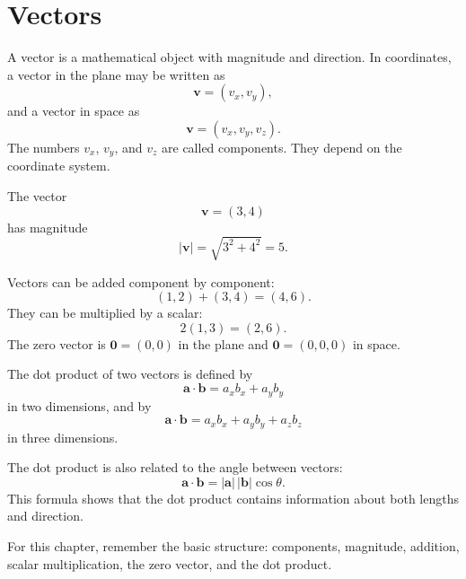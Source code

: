 \section{Vectors}

A vector is a mathematical object with magnitude and direction. In coordinates, a vector in the plane may be written as
\[
\mathbf{v}=(v_x,v_y),
\]
and a vector in space as
\[
\mathbf{v}=(v_x,v_y,v_z).
\]
The numbers \(v_x\), \(v_y\), and \(v_z\) are called components. They depend on the coordinate system.

\begin{examplebox}
The vector
\[
\mathbf{v}=(3,4)
\]
has magnitude
\[
|\mathbf{v}|=\sqrt{3^2+4^2}=5.
\]
\end{examplebox}

\begin{center}
\end{center}

Vectors can be added component by component:
\[
(1,2)+(3,4)=(4,6).
\]
They can be multiplied by a scalar:
\[
2(1,3)=(2,6).
\]
The zero vector is \(\mathbf{0}=(0,0)\) in the plane and \(\mathbf{0}=(0,0,0)\) in space.

The dot product of two vectors is defined by
\[
\mathbf{a}\cdot\mathbf{b}=a_xb_x+a_yb_y
\]
in two dimensions, and by
\[
\mathbf{a}\cdot\mathbf{b}=a_xb_x+a_yb_y+a_zb_z
\]
in three dimensions.

The dot product is also related to the angle between vectors:
\[
\mathbf{a}\cdot\mathbf{b}=|\mathbf{a}|\,|\mathbf{b}|\cos\theta.
\]
This formula shows that the dot product contains information about both lengths and direction.

\begin{summarybox}
For this chapter, remember the basic structure: components, magnitude, addition, scalar multiplication, the zero vector, and the dot product.
\end{summarybox}
